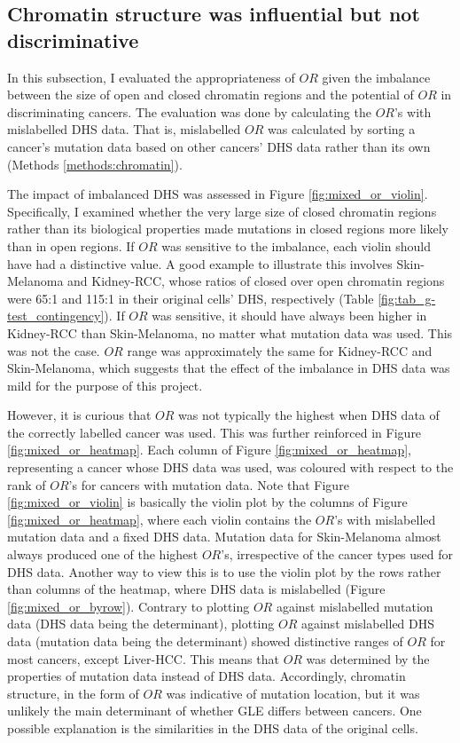 \subsection{Chromatin structure was influential but not discriminative}\label{gle:mixed_or}

In this subsection, I evaluated the appropriateness of $OR$ given the imbalance between the size of open and closed chromatin regions and the potential of $OR$ in discriminating cancers. The evaluation was done by calculating the $OR$'s with mislabelled DHS data. That is, mislabelled $OR$ was calculated by sorting a cancer's mutation data based on other cancers' DHS data rather than its own (Methods \ref{methods:chromatin}). 

The impact of imbalanced DHS was assessed in Figure \ref{fig:mixed_or_violin}. Specifically, I examined whether the very large size of closed chromatin regions rather than its biological properties made mutations in closed regions more likely than in open regions. If $OR$ was sensitive to the imbalance, each violin should have had a distinctive value. A good example to illustrate this involves Skin-Melanoma and Kidney-RCC, whose ratios of closed over open chromatin regions were 65:1 and 115:1 in their original cells' DHS, respectively (Table \ref{fig:tab_g-test_contingency}). If $OR$ was sensitive, it should have always been higher in Kidney-RCC than Skin-Melanoma, no matter what mutation data was used. This was not the case. $OR$ range was approximately the same for Kidney-RCC and Skin-Melanoma, which suggests that the effect of the imbalance in DHS data was mild for the purpose of this project.

However, it is curious that $OR$ was not typically the highest when DHS data of the correctly labelled cancer was used. This was further reinforced in Figure \ref{fig:mixed_or_heatmap}. Each column of Figure \ref{fig:mixed_or_heatmap}, representing a cancer whose DHS data was used, was coloured with respect to the rank of $OR$'s for cancers with mutation data. Note that Figure \ref{fig:mixed_or_violin} is basically the violin plot by the columns of Figure \ref{fig:mixed_or_heatmap}, where each violin contains the $OR$'s with mislabelled mutation data and a fixed DHS data. Mutation data for Skin-Melanoma almost always produced one of the highest $OR$'s, irrespective of the cancer types used for DHS data. Another way to view this is to use the violin plot by the rows rather than columns of the heatmap, where DHS data is mislabelled (Figure \ref{fig:mixed_or_byrow}). Contrary to plotting $OR$ against mislabelled mutation data (DHS data being the determinant), plotting $OR$ against mislabelled DHS data (mutation data being the determinant) showed distinctive ranges of $OR$ for most cancers, except Liver-HCC. This means that $OR$ was determined by the properties of mutation data instead of DHS data. Accordingly, chromatin structure, in the form of $OR$ was indicative of mutation location, but it was unlikely the main determinant of whether GLE differs between cancers. One possible explanation is the similarities in the DHS data of the original cells.

